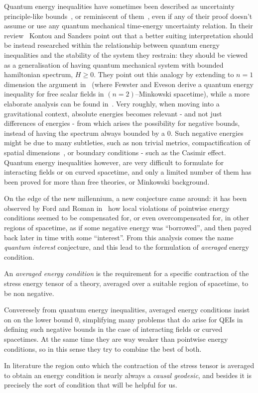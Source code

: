 Quantum energy inequalities have sometimes been described as uncertainty principle-like bounds~\cite[]{ford1998quantum}, or reminiscent of them~\cite[]{fewster1999bounds}, even if any of their proof doesn't assume or use any quantum mechanical time-energy uncertainty relation.
In their review~\cite[]{kontou2020energy} Kontou and Sanders point out that a better suiting interpretation should be instead researched within the relationship between quantum energy inequalities and the stability of the system they restrain: they should be viewed as a generalisation of having quantum mechanical system with bounded hamiltonian spectrum, \(H \ge 0\). They point out this analogy by extending to \(n = 1\) dimension the argument in~\cite[]{fewster1998bounds} (where Fewster and Eveson derive a quantum energy inequality for free scalar fields in \((n = 2)\)--Minkowski spacetime), while a more elaborate analysis can be found in~\cite[]{fewster2003stability}. Very roughly, when moving into a gravitational context, absolute energies becomes relevant - and not just differences of energies - from which arises the possibility for negative bounds, instead of having the spectrum always bounded by a \(0\). Such negative energies might be due to many subtleties, such as non trivial metrics, compactification of spatial dimensions~\cite[]{banach1979vacuum, louko1998inextendible}, or boundary conditions - such as the Casimir effect. Quantum energy inequalities however, are very difficult to formulate for interacting fields or on curved spacetime, and only a limited number of them has been proved for more than free theories, or Minkowski background. 

On the edge of the new millennium, a new conjecture came around: it has been observed by Ford and Roman in~\cite[]{ford1999quantum} how local violations of pointwise energy conditions seemed to be compensated for, or even overcompensated for, in other regions of spacetime, as if some negative energy was ``borrowed'', and then payed back later in time with some ``interest''. From this analysis comes the name \emph{quantum interest} conjecture, and this lead to the formulation of \emph{averaged} energy condition.
\begin{definition}
    An \emph{averaged energy condition} is the requirement for a specific contraction of the stress energy tensor of a theory, averaged over a suitable region of spacetime, to be non negative.
\end{definition}
\begin{remark}
    Converesely from quantum energy inequalities, averaged energy conditions insist on on the lower bound \(0\), simplifying many problems that do arise for QEIs in defining such negative bounds in the case of interacting fields or curved spacetimes. At the same time they are way weaker than pointwise energy conditions, so in this sense they try to combine the best of both.
\end{remark}
In literature the region onto which the contraction of the stress tensor is averaged to obtain an energy condition is nearly always a \emph{causal geodesic}, and besides it is precisely the sort of condition that will be helpful for us.

